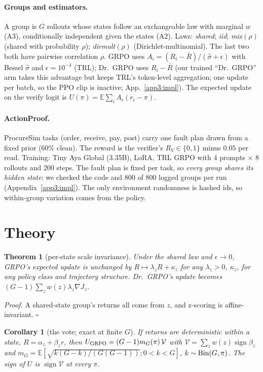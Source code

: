 \documentclass[11pt]{article}
\newtheorem{theorem}{Theorem}
\newtheorem{corollary}{Corollary}
\newcommand{\sgn}{\operatorname{sign}}
\begin{document}
\paragraph{Groups and estimators.} A group is $G$ rollouts whose states follow an exchangeable law with marginal $w$
(A3), conditionally independent given the states (A2). Laws: \emph{shared}; \emph{iid}; \emph{mix}$(\rho)$ (shared
with probability $\rho$); \emph{dirmult}$(\rho)$ (Dirichlet-multinomial). The last two both have pairwise
correlation $\rho$. GRPO uses $A_i=(R_i-\bar R)/(\hat\sigma+\epsilon)$ with Bessel $\hat\sigma$ and
$\epsilon=10^{-4}$ (TRL); Dr.~GRPO uses $R_i-\bar R$ (our trained ``Dr.~GRPO'' arm takes this advantage but keeps TRL's
token-level aggregation; one update per batch, so the PPO clip is inactive; App.~\ref{app3:impl}). The expected update on the verify logit is
$U(\pi)=\mathbb E\sum_iA_i(r_i-\pi)$.

\paragraph{ActionProof.} ProcureSim tasks (order, receive, pay, post) carry one fault plan drawn from a fixed prior
(60\% clean). The reward is the verifier's $R_V\in\{0,1\}$ minus $0.05$ per read. Training: Tiny Aya Global (3.35B),
LoRA, TRL GRPO with 4 prompts $\times$ 8 rollouts and 200 steps. The fault plan is fixed per task, so \emph{every
group shares its hidden state}: we checked the code and 800 of 800 logged groups per run
(Appendix~\ref{app3:impl}). The only environment randomness is hashed ids, so within-group variation comes from the
policy.

\section{Theory}\label{sec:theory}
\begin{theorem}[per-state scale invariance]\label{thm:inv}
Under the shared law and $\epsilon\to0$, GRPO's expected update is unchanged by $R\mapsto\lambda_zR+\kappa_z$ for any
$\lambda_z>0$, $\kappa_z$, for any policy class and trajectory structure. Dr.~GRPO's update becomes
$(G-1)\sum_zw(z)\lambda_z\nabla J_z$.
\end{theorem}
\noindent\emph{Proof.} A shared-state group's returns all come from $z$, and z-scoring is affine-invariant.
$\square$

\begin{corollary}[the vote; exact at finite $G$]\label{cor:vote}
If returns are deterministic within a state, $R=\alpha_z+\beta_zr$, then
$U_{\rm GRPO}=(G-1)m_G(\pi)\,\mathcal V$ with $\mathcal V=\sum_zw(z)\sgn\beta_z$ and
$m_G=\mathbb E[\sqrt{k(G-k)/(G(G-1))};0<k<G]$, $k\sim{\rm Bin}(G,\pi)$. The sign of $U$ is $\sgn\mathcal V$ at every
$\pi$.
\end{corollary}
\end{document}

